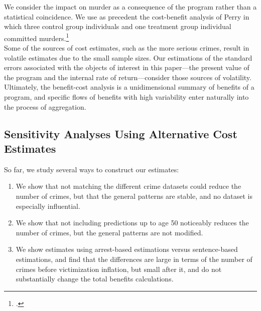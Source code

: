 \noindent We consider the impact on murder as a consequence of the program rather than a statistical coincidence. We use as precedent the cost-benefit analysis of Perry in which three control group individuals and one treatment group individual committed murders.\footnote{\citet{Heckman_Moon_etal_2010_RateofReturn}.} \\

Some of the sources of cost estimates, such as the more serious crimes, result in volatile estimates due to the small sample sizes. Our estimations of the standard errors associated with the objects of interest in this paper---the present value of the program and the internal rate of return---consider those sources of volatility. Ultimately, the benefit-cost analysis is a unidimensional summary of benefits of a program, and specific flows of benefits with high variability enter naturally into the process of aggregation. \\

%

\subsection{Sensitivity Analyses Using Alternative Cost Estimates}
\noindent So far, we study several ways to construct our estimates: \\

\begin{enumerate}
\item We show that not matching the different crime datasets could reduce the number of crimes, but that the general patterns are stable, and no dataset is especially influential.
\item We show that not including predictions up to age 50 noticeably reduces the number of crimes, but the general patterns are not modified.
\item We show estimates using arrest-based estimations versus sentence-based estimations, and find that the differences are large in terms of the number of crimes before victimization inflation, but small after it, and do not substantially change the total benefits calculations.
\end{enumerate}

